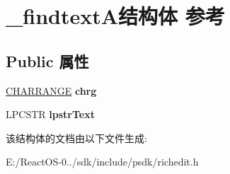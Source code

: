 \hypertarget{struct__findtext_a}{}\section{\+\_\+findtext\+A结构体 参考}
\label{struct__findtext_a}
\subsection*{Public 属性}
\begin{DoxyCompactItemize}
\item 
\mbox{\label{struct__findtext_a_a882b43cdb29033cca0db7989f693f475}} 
\hyperlink{struct__charrange}{C\+H\+A\+R\+R\+A\+N\+GE} {\bfseries chrg}
\item 
\mbox{\label{struct__findtext_a_aa96f64614fe66ba6c3da3ea30a9573d8}} 
L\+P\+C\+S\+TR {\bfseries lpstr\+Text}
\end{DoxyCompactItemize}


该结构体的文档由以下文件生成\+:\begin{DoxyCompactItemize}
\item 
E\+:/\+React\+O\+S-\/0../sdk/include/psdk/richedit.\+h\end{DoxyCompactItemize}
